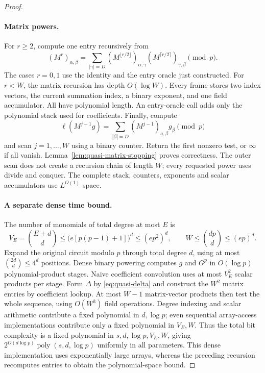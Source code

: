 \begin{proof}
\paragraph{Matrix powers.}
For $r\ge2$, compute one entry recursively from
\[
 (M^r)_{\alpha,\beta}
   =\sum_{|\gamma|=D}
      (M^{\lfloor r/2\rfloor})_{\alpha,\gamma}
      (M^{\lceil r/2\rceil})_{\gamma,\beta}\pmod p.
\]
The cases $r=0,1$ use the identity and the entry oracle just constructed.
For $r<W$, the matrix recursion has depth $O(\log W)$.
Every frame stores two index vectors, the current summation index, a
binary exponent, and one field accumulator. All have polynomial length.
An entry-oracle call adds only the polynomial stack used for coefficients.
Finally, compute
\[
 \ell(M^{j-1}g)=
 \sum_{|\beta|=D}(M^{j-1})_{a,\beta}g_\beta\pmod p
\]
and scan $j=1,\ldots,W$ using a binary counter. Return the first nonzero
test, or $\infty$ if all vanish. Lemma~\ref{lem:quasi-matrix-stopping}
proves correctness. The outer scan does not create a recursion chain of
length $W$; every requested power uses divide and conquer. The complete
stack, counters, exponents and scalar accumulators use $L^{O(1)}$ space.

\paragraph{A separate dense time bound.}
The number of monomials of total degree at most $E$ is
\[
 V_E=\binom{E+d}{d}
 \le \bigl(e[p(p-1)+1]\bigr)^d
 \le (ep^2)^d,
 \qquad W\le\binom{dp}{d}\le(ep)^d.
\]
Expand the original circuit modulo $p$ through total degree $d$,
using at most $\binom{2d}{d}\le4^d$ positions. Dense binary powering
computes $g$ and $G^p$ in $O(\log p)$ polynomial-product stages.
Naive coefficient convolution uses at most $V_E^2$ scalar products
per stage. Form $\Delta$ by \eqref{eq:quasi-delta} and construct the
$W^2$ matrix entries by coefficient lookup. At most $W-1$ matrix-vector
products then test the whole sequence, using $O(W^3)$ field operations.
Degree indexing and scalar arithmetic contribute a fixed polynomial in
$d,\log p$; even sequential array-access implementations contribute
only a fixed polynomial in $V_E,W$. Thus the total bit complexity is
a fixed polynomial in $s,d,\log p,V_E,W$, giving
$2^{O(d\log p)}\operatorname{poly}(s,d,\log p)$ uniformly in all
parameters. This dense implementation uses exponentially large arrays,
whereas the preceding recursion recomputes entries to obtain the
polynomial-space bound.
\end{proof}

